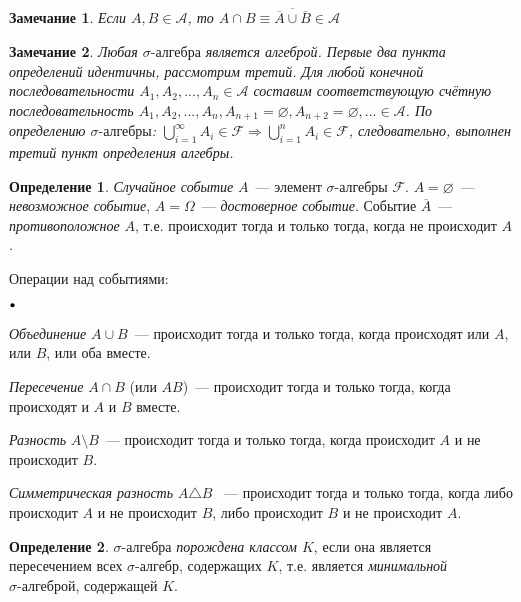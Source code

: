 \documentclass[oneside,final,14pt]{extreport}
\newtheorem*{rmrk}{Замечание}
\theoremstyle{definition}
\newtheorem{defn}{Определение}[section]
\newcommand\sbullet[1][.5]{\mathbin{\vcenter{\hbox{\scalebox{#1}{$\bullet$}}}}}
\newenvironment{compactlist}{
\begin{list}{{$\sbullet[.75]$}}{
\setlength\partopsep{0pt}
\setlength\parskip{0pt}
\setlength\parsep{0pt}
\setlength\topsep{0pt}
\setlength\itemsep{0pt}
}
}{
\end{list}
}
\begin{document}
\begin{rmrk}
    Если \( A, B \in \mathcal{A} \), то \( A \cap B \equiv \overline{\overline{A} \cup \overline{B}} \in \mathcal{A} \)
\end{rmrk}

\begin{rmrk}
    Любая \( \sigma \text{-алгебра} \) является алгеброй. Первые два пункта определений идентичны, рассмотрим третий. Для любой конечной последовательности \( A_1, A_2,..., A_n \in \mathcal{A}\) составим соответствующую счётную последовательность \( A_1, A_2, ..., A_n, A_{n+1}=\varnothing, A_{n+2}=\varnothing,... \in \mathcal{A} \). По определению \( \sigma \text{-алгебры} \): \( \bigcup\limits_{i=1}^\infty A_i \in \mathcal{F} \Rightarrow \bigcup\limits_{i=1}^n A_i \in \mathcal{F} \), следовательно, выполнен третий пункт определения алгебры.
\end{rmrk}

\begin{defn}
    {\it Случайное событие} \(A\)~--- элемент \( \sigma \text{-алгебры~} \mathcal{F} \). \(A=\varnothing\)~---{\it невозможное событие}, \(A=\Omega\)~--- {\it достоверное событие}. Событие \( \overline{A} \)~--- {\it противоположное} \(A\), т.е. происходит тогда и только тогда, когда не происходит \(A\).
\end{defn}

Операции над событиями:

\begin{compactlist}
    \item {\it Объединение} \(A \cup B \)~--- происходит тогда и только тогда, когда происходят или \(A\), или \(B\), или оба вместе.
    \item {\it Пересечение} \(A \cap B \) (или \(AB \))~--- происходит тогда и только тогда, когда происходят и \(A\) и \(B\) вместе.
    \item {\it Разность} \(A \setminus B \)~--- происходит тогда и только тогда, когда происходит \(A\) и не происходит \(B\).
    \item {\it Симметрическая разность} \(A \triangle B \) ~--- происходит тогда и только тогда, когда либо происходит \(A\) и не происходит \(B\), либо происходит \(B\) и не происходит \(A\).
\end{compactlist}

\begin{defn}
    \( \sigma \text{-алгебра} \) {\it порождена классом \(K\)}, если она является пересечением всех \( \sigma \text{-алгебр}\), содержащих \(K\), т.е. является {\it минимальной \( \sigma \text{-алгеброй} \)}, содержащей \(K\).
\end{defn}
\end{document}
